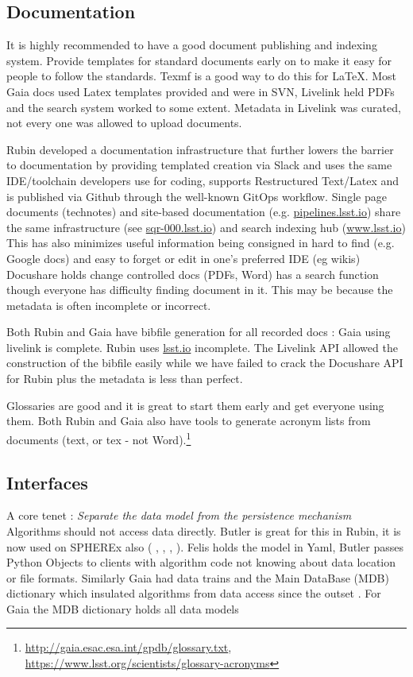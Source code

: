 \documentclass[11pt,twoside]{article}
\begin{document}
\subsection{Documentation}
It is highly recommended to have  a good document publishing and indexing system.
Provide templates for standard documents early on to make it easy for people to follow the standards. Texmf is a good way to do this for \LaTeX.
Most Gaia docs used Latex templates provided and were in SVN,  Livelink held PDFs and the search system worked to some extent.
Metadata in Livelink was curated, not every one was allowed to upload documents.

Rubin developed a documentation infrastructure that further lowers the barrier to documentation by providing templated creation via Slack and uses the same IDE/toolchain developers use for coding, supports Restructured Text/Latex and is published via Github through the well-known GitOps workflow.
Single page documents (technotes) and site-based documentation (e.g. \url{ pipelines.lsst.io}) share the same infrastructure (see \url{sqr-000.lsst.io}) and search indexing hub (\url{www.lsst.io})
This has also minimizes useful information being consigned in hard to find (e.g. Google docs) and easy to forget or edit in one’s preferred IDE (eg wikis)
Docushare holds change controlled docs (PDFs, Word) has a search function though everyone has difficulty finding document in it.
This may be because the metadata is often incomplete or incorrect.

Both Rubin and Gaia have  bibfile generation for all recorded docs : Gaia using   livelink is  complete. Rubin uses \url{lsst.io} incomplete.
The Livelink API allowed the construction of the bibfile easily while we have failed to crack the Docushare API for Rubin plus the metadata is less than perfect.

Glossaries are good and it is great to start them early and get everyone using them.
Both Rubin and Gaia also have tools to generate acronym lists from documents (text, or tex - not Word).\footnote{\url{http://gaia.esac.esa.int/gpdb/glossary.txt}, \url{https://www.lsst.org/scientists/glossary-acronyms}}


\subsection{Interfaces}
A core tenet : \emph{Separate the data model from the persistence mechanism}
Algorithms should not access data directly.
Butler is great for this in Rubin, it is  now used on SPHEREx also (\cite{2022SPIE12189E..11J} , \cite{2019ASPC..523..653J}, \cite{C24_adassxxxii}, \cite{P52_adassxxxii}).
Felis holds the model in Yaml, Butler passes Python Objects to clients with algorithm code not knowing about data location or file formats.
Similarly Gaia had data trains and the Main DataBase (MDB) dictionary which insulated algorithms from data access since the outset \citep{1999BaltA...8...57O}.
For Gaia the MDB dictionary holds all data models  \citep{2015ASPC..495...47H, 2011ASPC..442..351O}
\end{document}
